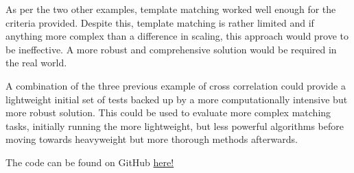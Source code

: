 \documentclass[conference]{IEEEtran}
\begin{document}
As per the two other examples, template matching worked well enough for the criteria provided. Despite this, template matching is rather limited and if anything more complex than a difference in scaling, this approach would prove to be ineffective. A more robust and comprehensive solution would be required in the real world.

A combination of the three previous example of cross correlation could provide a lightweight initial set of tests backed up by a more computationally intensive but more robust solution. This could be used to evaluate more complex matching tasks, initially running the more lightweight, but less powerful algorithms before moving towards heavyweight but more thorough methods afterwards. 





The code can be found on GitHub \href{https://github.com/LukeDWaller99/Aint308}{here!} 

\onecolumn
\end{document}
